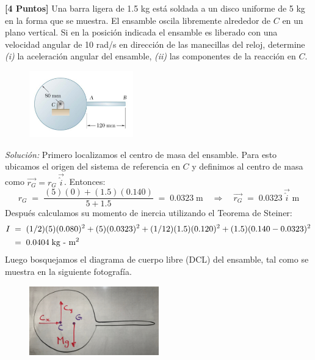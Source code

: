 \documentclass[ a4paper, twoside, 11pt]{article}
\begin{document}
\begin{problem}
\textbf{[4 Puntos]} Una barra ligera de 1.5 kg est\'a soldada a un disco uniforme de 5 kg en la forma que se muestra. El ensamble oscila libremente alrededor de $C$ en un plano vertical. Si en la posici\'on indicada el ensamble es liberado con una velocidad angular de 10 rad/s \linebreak en direcci\'on de las manecillas del reloj, determine \textit{(i)} la aceleraci\'on angular del ensamble, \linebreak \textit{(ii)} las componentes de la reacci\'on en $C$. 

\begin{figure}[htb]
\centering
\includegraphics[width=0.4\textwidth]{problema-2.jpg}
\end{figure}

\emph{Soluci\'on:} Primero localizamos el centro de masa del ensamble. Para esto ubicamos el origen del sistema de referencia en $C$ y definimos al centro de masa como $\vec{r_G} = r_G \, \vec{\hat{i}}$. Entonces: 
\[
r_G \; = \; \frac{(5)(0) + (1.5)(0.140)}{5+1.5} \; = \;
0.0323 \; \text{m} \quad \Longrightarrow \quad
\vec{r_G} \; = \; 0.0323 \, \vec{\hat{i}} \; \text{m}
\]
Despu\'es calculamos su momento de inercia utilizando el Teorema de Steiner: 
\begin{align*}
I \;
& = \; (1/2)(5)(0.080)^2 + (5)(0.0323)^2 + (1/12)(1.5)(0.120)^2 + (1.5)(0.140-0.0323)^2 \\
& = \; 0.0404 \; \text{kg - m\ensuremath{^{\text{2}}}}
\end{align*}
Luego bosquejamos el diagrama de cuerpo libre (DCL) del ensamble, tal como se muestra en la siguiente fotograf\'ia. 
\begin{figure}[htb]
\centering
\includegraphics[width=0.5\textwidth]{problema-2_DCL.jpg}
\end{figure}


\end{problem}
\end{document}

